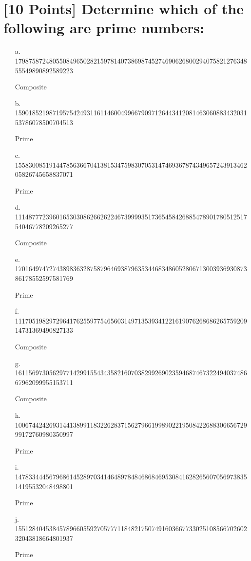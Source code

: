 \documentclass{article}
\begin{document}
\section{[10 Points] Determine which of the following are prime numbers:}
\begin{enumerate}
 \item [a. ] 1798758724805508496502821597814073869874527469062680029407582127634855549890892589223
 
 Composite
 
 \item [b. ] 1590185219871957542493116114600499667909712644341208146306088343203153786078500704513
 
 Prime
 \item [c. ] 1558300851914478563667041381534759830705314746936787434965724391346205826745658837071
 
 Prime
 \item [d. ] 1114877723960165303086266262246739999351736545842688547890178051251754046778209265277
 
 Composite
 \item [e. ] 1701649747274389836328758796469387963534468348605280671300393693087386178552597581769
 
 Prime
 \item [f. ] 1117051982972964176255977546560314971353934122161907626868626575920914731369490827133
 
 Composite
 \item [g. ] 1611569730562977142991554343582160703829926902359468746732249403748667962099955153711
 
 Composite
 \item [h. ] 1006744242693144138991183226283715627966199890221950842268830665672999172760980350997
 
 Prime
 \item [i. ] 1478334445679686145289703414648978484686846953084162826560705697383514195532048498801
 
 Prime
 \item [j. ] 1551284045384578966055927057771184821750749160366773302510856670260232043818664801937
 
 Prime
\end{enumerate}
\end{document}
